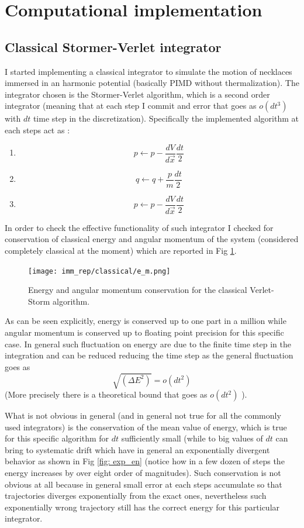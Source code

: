 \documentclass[10pt,a4paper]{article}
\begin{document}
\section{Computational implementation}
\subsection{Classical Stormer-Verlet integrator}
I started implementing a classical integrator to simulate the motion of necklaces immersed in an harmonic potential (basically PIMD without thermalization).
The integrator chosen is the Stormer-Verlet algorithm, which is a second order integrator (meaning that at each step I commit and error that goes as $o(dt^3)$ with $dt$ time step in the discretization). Specifically the implemented algorithm at each steps act as :
\begin{enumerate}
	\item \[p \leftarrow p - \frac{dV}{d\vec{x}}\frac{dt}{2}\]
	\item \[ q \leftarrow q + \frac{p}{m}\frac{dt}{2}\]
	\item \[ p \leftarrow p - \frac{dV}{d\vec{x}}\frac{dt}{2}\]
\end{enumerate}
In order to check the effective functionality of such integrator I checked for conservation of classical energy and angular momentum of the system (considered completely classical at the moment) which are reported in Fig \ref{fig: e_m}.
\begin{figure}[h]
	\begin{center}
		\texttt{[image: imm\_rep/classical/e\_m.png]}
	\end{center}
	\caption{Energy and angular momentum conservation for the classical Verlet-Storm algorithm.}
	\label{fig: e_m}
\end{figure}
As can be seen explicitly, energy is conserved up to one part in a million while angular momentum is conserved up to floating point precision for this specific case. In general such fluctuation on energy are due to the finite time step in the integration and can be reduced reducing the time step as the general fluctuation goes as
\[ \sqrt{(\Delta E^2)} = o(dt^2)  \]
(More precisely there is a theoretical bound that goes as $o(dt^2)$ ).

What is not obvious in general (and in general not true for all the commonly used integrators) is the conservation of the mean value of energy, which is true for this specific algorithm for $dt$ sufficiently small (while to big values of $dt$ can bring to systematic drift which have in general an exponentially divergent behavior as shown in Fig \ref{fig: exp_en} (notice how in a few dozen of steps the energy increases by over eight order of magnitudes). Such conservation is not obvious at all because in general small error at each steps accumulate so that trajectories diverges exponentially from the exact ones, nevertheless such exponentially wrong trajectory still has the correct energy for this particular integrator.
\end{document}
